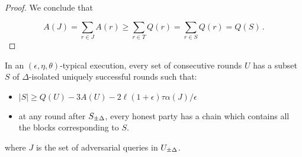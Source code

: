 \begin{proof}
  We conclude that

  \[
  A(J) =
  \sum_{r \in J} A(r) \geq \sum_{r \in T} Q(r) = \sum_{r \in S} Q(r)
  = Q(S)\,.
  \]
\end{proof}

\begin{lemma}[Unsuppressibility]
  In an $(\epsilon, \eta, \theta)$-typical execution, every set of consecutive
  rounds $U$ has a subset $S$ of $\Delta$-isolated uniquely successful rounds
  such that:
  \begin{itemize}
    \item $|S| \geq Q(U) - 3A(U) - 2\ell(1 + \epsilon)\tau\alpha(J)/\epsilon$
    \item at any round after $S_{\pm\Delta}$, every honest party has a
          chain which contains all the blocks corresponding to $S$.
  \end{itemize}
  where $J$ is the set of adversarial queries in $U_{\pm\Delta}$.
\end{lemma}
